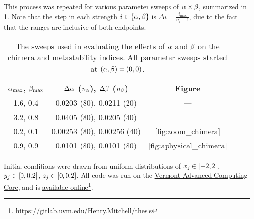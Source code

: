 This process was repeated for various parameter sweeps of $\alpha \times \beta$, summarized in \cref{tab:parameter_sweeps}.
Note that the step in each strength $i \in \Bqty{\hra, \hrb}$ is $\Delta i = \frac{i_{\text{max}}}{n_{i} - 1}$, due to the fact that the ranges are inclusive of both endpoints.
\begin{table}[ht]
  \centering
  \begin{tabular}{c | c | c}
    $\alpha_{\text{max}}$, $\beta_{\text{max}}$ & $\Delta \alpha$ ($n_{\alpha}$), $\Delta \beta$ ($n_{\beta}$) & Figure \\ \hline
    1.6, 0.4 & 0.0203 (80), 0.0211 (20) & --- \\
    3.2, 0.8 & 0.0405 (80), 0.0205 (40) & --- \\
    0.2, 0.1 & 0.00253 (80), 0.00256 (40) & \cref{fig:zoom_chimera} \\
    0.9, 0.9 & 0.0101 (80), 0.0101 (80) & \cref{fig:aphysical_chimera}
  \end{tabular}
  \caption[Parameter sweeps]{The sweeps used in evaluating the effects of $\alpha$ and $\beta$ on the chimera and metastability indices.
    All parameter sweeps started at $(\alpha, \beta) = (0, 0)$.
  }
  \label{tab:parameter_sweeps}
\end{table}

Initial conditions were drawn from uniform distributions of $x_{j} \in \bqty{-2, 2}$, $y_{j} \in \bqty{0, 0.2}$, $z_{j} \in \bqty{0, 0.2}$.
All code was run on the \href{https://www.uvm.edu/vacc}{Vermont Advanced Computing Core}, and is \href{https://gitlab.uvm.edu/Henry.Mitchell/thesis}{available online}\footnote{\href{https://gitlab.uvm.edu/Henry.Mitchell/thesis}{https://gitlab.uvm.edu/Henry.Mitchell/thesis}}.

